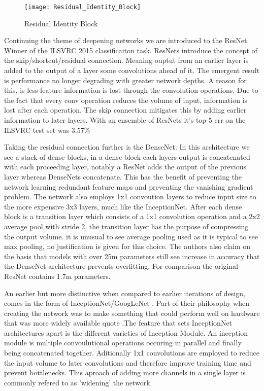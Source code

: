   \par
  \begin{figure}
    \centering
    \texttt{[image: Residual\_Identity\_Block]}
    \caption{\label{fig:resnet_id_block}Residual Identity Block}
  \end{figure}
  Continuing the theme of deepening networks we are introduced to the ResNet \cite{He} Winner of the ILSVRC 2015 classificaiton task. ResNets introduce the concept of the skip/shortcut/residual connection. Meaning ouptut from an earlier layer is added to the output of a layer some convolutions ahead of it. The emergent result is performance no longer degrading with greater network depths. A reason for this, is less feature information is lost through the convolution operations. Due to the fact that every conv operation reduces the volume of input, information is lost after each operation. The skip connection mitigates this by adding earlier information to later layers. With an ensemble of ResNets it's top-5 err on the ILSVRC test set was 3.57\%
  \par
  Taking the residual connection further is the DenseNet. In this architecture we see a stack of dense blocks, in a dense block each layers output is concatenated with each proceeding layer, notably a ResNet adds the output of the previous layer whereas DenseNets concatenate. This has the benefit of preventing the network learning redundant feature maps and preventing the vanishing gradient problem. The network also employs 1x1 convoution layers to reduce input size to the more expensive 3x3 layers, much like the InceptionNet. After each dense block is a transition layer which consists of a 1x1 convolution operation and a 2x2 average pool with stride 2, the transition layer has the purpose of compressing the output volume. it is unusual to see average pooling used as it is typical to see max pooling, no justification is given for this choice. The authors also claim on the basis that models with over 25m parameters still see increase in accuracy that the DenseNet architecture prevents overfitting. For comparison the original ResNet contains 1.7m parameters.
  \par
  An earlier but more distinctive when compared to earlier iterations of design, comes in the form of InceptionNet/GoogLeNet \cite{Szegedy2015}. Part of their philosophy when creating the network was to make something that could perform well on hardware that was more widely available quote \cite{Szegedy2015}.The feature that sets InceptionNet architectures apart is the different varieties of Inception Module. An inception module is multiple convoulutional operations occuring in parallel and finally being concatenated together. Aditionally 1x1 convolutions are employed to reduce the input volume to later convolutions and therefore improve training time and prevent bottlenecks. This aproach of adding more channels in a single layer is commonly refered to as 'widening' the network.
